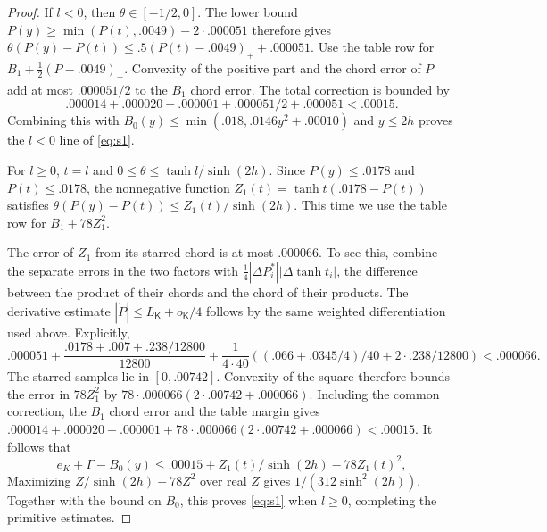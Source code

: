 \begin{proof}
If $l<0$, then $\theta\in[-1/2,0]$. The lower bound $P(y)\ge\min(P(t),.0049)-2\cdot.000051$ therefore gives $\theta(P(y)-P(t))\le.5(P(t)-.0049)_++ .000051$. Use the table row for $B_1+\tfrac12(P-.0049)_+$. Convexity of the positive part and the chord error of $P$ add at most $.000051/2$ to the $B_1$ chord error. The total correction is bounded by
\[
 .000014+.000020+.000001+.000051/2+.000051<.00015.
\]
Combining this with $B_0(y)\le\min(.018,.0146y^2+.00010)$ and $y\le2h$ proves the $l<0$ line of \eqref{eq:s1}.

For $l\ge0$, $t=l$ and $0\le\theta\le\tanh l/\sinh(2h)$. Since $P(y)\le.0178$ and $P(t)\le.0178$, the nonnegative function $Z_1(t)=\tanh t(.0178-P(t))$ satisfies $\theta(P(y)-P(t))\le Z_1(t)/\sinh(2h)$. This time we use the table row for $B_1+78Z_1^2$.

The error of $Z_1$ from its starred chord is at most $.000066$. To see this, combine the separate errors in the two factors with $\tfrac14|\Delta P_i^*||\Delta\tanh t_i|$, the difference between the product of their chords and the chord of their products. The derivative estimate $|\dot P|\le L_{\mathsf K}+o_{\mathsf K}/4$ follows by the same weighted differentiation used above. Explicitly,
\[
 .000051+\frac{.0178+.007+.238/12800}{12800}
 +\frac1{4\cdot40}\left((.066+.0345/4)/40+2\cdot.238/12800\right)<.000066 .
\]
The starred samples lie in $[0,.00742]$. Convexity of the square therefore bounds the error in $78Z_1^2$ by $78\cdot.000066(2\cdot.00742+.000066)$. Including the common correction, the $B_1$ chord error and the table margin gives $ .000014+.000020+.000001+ 78\cdot.000066(2\cdot.00742+.000066)<.00015$. It follows that
\[
 e_K+\Gamma-B_0(y)\le .00015+Z_1(t)/\sinh(2h)-78 Z_1(t)^2 ,
\]
Maximizing $Z/\sinh(2h)-78Z^2$ over real $Z$ gives $1/(312\sinh^2(2h))$. Together with the bound on $B_0$, this proves \eqref{eq:s1} when $l\ge0$, completing the primitive estimates.


\end{proof}
